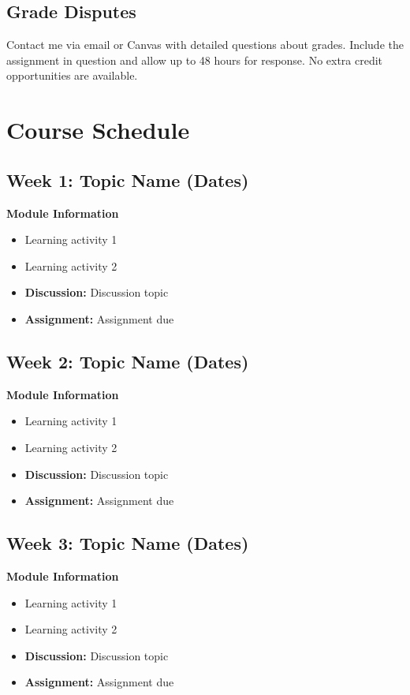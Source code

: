 \documentclass[11pt]{scrartcl} %
\begin{document}
\subsection{Grade Disputes}
Contact me via email or Canvas with detailed questions about grades. Include the assignment in question and allow up to 48 hours for response. No extra credit opportunities are available.

\section{Course Schedule}

\subsection{Week 1: Topic Name (Dates)}
\textbf{Module Information}
\begin{itemize}
\item Learning activity 1
\item Learning activity 2
\item \textbf{Discussion:} Discussion topic
\item \textbf{Assignment:} Assignment due
\end{itemize}

\subsection{Week 2: Topic Name (Dates)}
\textbf{Module Information}
\begin{itemize}
\item Learning activity 1
\item Learning activity 2
\item \textbf{Discussion:} Discussion topic
\item \textbf{Assignment:} Assignment due
\end{itemize}

\subsection{Week 3: Topic Name (Dates)}
\textbf{Module Information}
\begin{itemize}
\item Learning activity 1
\item Learning activity 2
\item \textbf{Discussion:} Discussion topic
\item \textbf{Assignment:} Assignment due
\end{itemize}
\end{document}
